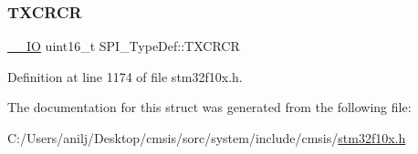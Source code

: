 \subsubsection{\texorpdfstring{T\+X\+C\+R\+CR}{TXCRCR}}
{\footnotesize\ttfamily \hyperlink{core__sc300_8h_aec43007d9998a0a0e01faede4133d6be}{\+\_\+\+\_\+\+IO} uint16\+\_\+t S\+P\+I\+\_\+\+Type\+Def\+::\+T\+X\+C\+R\+CR}



Definition at line 1174 of file stm32f10x.\+h.



The documentation for this struct was generated from the following file\+:\begin{DoxyCompactItemize}
\item 
C\+:/\+Users/anilj/\+Desktop/cmsis/sorc/system/include/cmsis/\hyperlink{stm32f10x_8h}{stm32f10x.\+h}\end{DoxyCompactItemize}
